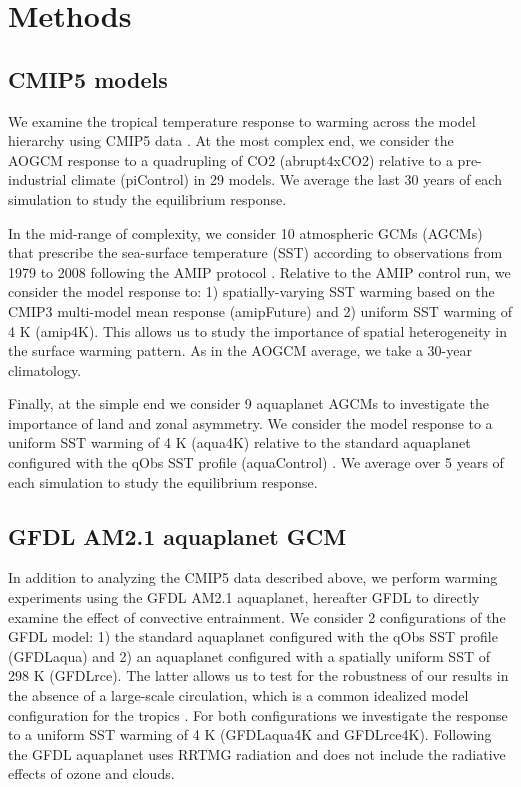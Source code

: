 \documentclass{ametsocV5}
\begin{document}
\section{Methods} \label{methods}
\subsection{CMIP5 models} \label{data-hierarchy}
We examine the tropical temperature response to warming across the model hierarchy using CMIP5 data \citep{taylor-et-al-2012}. At the most complex end, we consider the AOGCM response to a quadrupling of CO2 (abrupt4xCO2) relative to a pre-industrial climate (piControl) in 29 models. We average the last 30 years of each simulation to study the equilibrium response.

In the mid-range of complexity, we consider 10 atmospheric GCMs (AGCMs) that prescribe the sea-surface temperature (SST) according to observations from 1979 to 2008 following the AMIP protocol \citep{gates-1992}. Relative to the AMIP control run, we consider the model response to: 1) spatially-varying SST warming based on the CMIP3 multi-model mean response (amipFuture) and 2) uniform SST warming of 4 K (amip4K). This allows us to study the importance of spatial heterogeneity in the surface warming pattern. As in the AOGCM average, we take a 30-year climatology.

Finally, at the simple end we consider 9 aquaplanet AGCMs to investigate the importance of land and zonal asymmetry. We consider the model response to a uniform SST warming of 4 K (aqua4K) relative to the standard aquaplanet configured with the qObs SST profile (aquaControl) \citep{neale-hoskins-2000}. We average over 5 years of each simulation to study the equilibrium response.

\subsection{GFDL AM2.1 aquaplanet GCM} \label{gfdl}
In addition to analyzing the CMIP5 data described above, we perform warming experiments using the GFDL AM2.1 aquaplanet, hereafter GFDL to directly examine the effect of convective entrainment. We consider 2 configurations of the GFDL model: 1) the standard aquaplanet configured with the qObs SST profile (GFDLaqua) \citep{neale-hoskins-2000} and 2) an aquaplanet configured with a spatially uniform SST of 298 K (GFDLrce). The latter allows us to test for the robustness of our results in the absence of a large-scale circulation, which is a common idealized model configuration for the tropics \citep{wing-et-al-2018}. For both configurations we investigate the response to a uniform SST warming of 4 K (GFDLaqua4K and GFDLrce4K). Following \citet{tan-et-al-2019} the GFDL aquaplanet uses RRTMG radiation and does not include the radiative effects of ozone and clouds.
\end{document}
